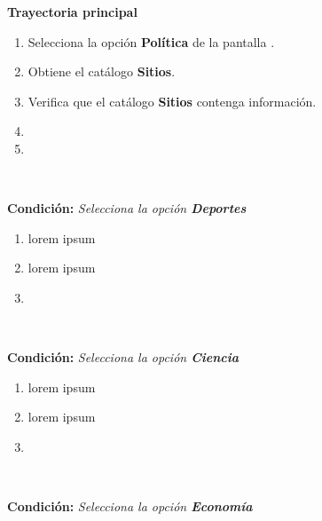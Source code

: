 

\begin{large}
	\textbf{Trayectoria principal}\\
\end{large}	

\begin{enumerate}[1.]
	\item \actor Selecciona la opción \textbf{Política} de la pantalla .   
	\item \sistema Obtiene el catálogo \textbf{Sitios}.
	\item \sistema Verifica que el catálogo \textbf{Sitios} contenga información. 
	\item \sistema 
	\item \finCU	
\end{enumerate}



\begin{large}
	\\
\end{large}	
\textbf{Condición:} \textit{Selecciona la opción \textbf{Deportes}}
\begin{enumerate}[{A-}1.]
	\item \actor lorem ipsum
	\item \sistema lorem ipsum
	\item \finTA	

\end{enumerate}


\begin{large}
	\\
\end{large}	
\textbf{Condición:} \textit{Selecciona la opción \textbf{Ciencia}}

\begin{enumerate}[{B-}1.]

	\item \actor lorem ipsum
	\item \sistema lorem ipsum
	\item \finTA	

\end{enumerate}


\begin{large}
	\\
\end{large}	
\textbf{Condición:} \textit{Selecciona la opción \textbf{Economía}}

